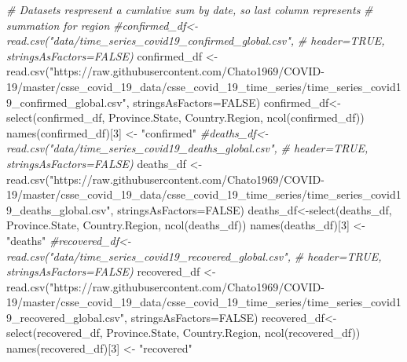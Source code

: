 \documentclass[
]{article}
\newenvironment{Shaded}{\begin{snugshade}}{\end{snugshade}}
\newcommand{\AttributeTok}[1]{\textcolor[rgb]{0.77,0.63,0.00}{#1}}
\newcommand{\CommentTok}[1]{\textcolor[rgb]{0.56,0.35,0.01}{\textit{#1}}}
\newcommand{\ConstantTok}[1]{\textcolor[rgb]{0.00,0.00,0.00}{#1}}
\newcommand{\DecValTok}[1]{\textcolor[rgb]{0.00,0.00,0.81}{#1}}
\newcommand{\FunctionTok}[1]{\textcolor[rgb]{0.00,0.00,0.00}{#1}}
\newcommand{\NormalTok}[1]{#1}
\newcommand{\OtherTok}[1]{\textcolor[rgb]{0.56,0.35,0.01}{#1}}
\newcommand{\StringTok}[1]{\textcolor[rgb]{0.31,0.60,0.02}{#1}}
\begin{document}
\begin{Shaded}
\begin{Highlighting}[]
\CommentTok{\# Datasets respresent a cumlative sum by date, so last column represents }
\CommentTok{\# summation for region}
\CommentTok{\#confirmed\_df\textless{}{-}read.csv("data/time\_series\_covid19\_confirmed\_global.csv", }
\CommentTok{\#                       header=TRUE, stringsAsFactors=FALSE)}
\NormalTok{confirmed\_df }\OtherTok{\textless{}{-}} \FunctionTok{read.csv}\NormalTok{(}\StringTok{"https://raw.githubusercontent.com/Chato1969/COVID{-}19/master/csse\_covid\_19\_data/csse\_covid\_19\_time\_series/time\_series\_covid19\_confirmed\_global.csv"}\NormalTok{, }\AttributeTok{stringsAsFactors=}\ConstantTok{FALSE}\NormalTok{)}
\NormalTok{confirmed\_df}\OtherTok{\textless{}{-}}\FunctionTok{select}\NormalTok{(confirmed\_df, Province.State, }
\NormalTok{                     Country.Region, }\FunctionTok{ncol}\NormalTok{(confirmed\_df))}
\FunctionTok{names}\NormalTok{(confirmed\_df)[}\DecValTok{3}\NormalTok{] }\OtherTok{\textless{}{-}} \StringTok{"confirmed"}
\CommentTok{\#deaths\_df\textless{}{-}read.csv("data/time\_series\_covid19\_deaths\_global.csv", }
\CommentTok{\#                    header=TRUE, stringsAsFactors=FALSE)}
\NormalTok{deaths\_df }\OtherTok{\textless{}{-}} \FunctionTok{read.csv}\NormalTok{(}\StringTok{"https://raw.githubusercontent.com/Chato1969/COVID{-}19/master/csse\_covid\_19\_data/csse\_covid\_19\_time\_series/time\_series\_covid19\_deaths\_global.csv"}\NormalTok{, }\AttributeTok{stringsAsFactors=}\ConstantTok{FALSE}\NormalTok{)}
\NormalTok{deaths\_df}\OtherTok{\textless{}{-}}\FunctionTok{select}\NormalTok{(deaths\_df, Province.State, }
\NormalTok{                  Country.Region, }\FunctionTok{ncol}\NormalTok{(deaths\_df))}
\FunctionTok{names}\NormalTok{(deaths\_df)[}\DecValTok{3}\NormalTok{] }\OtherTok{\textless{}{-}} \StringTok{"deaths"}
\CommentTok{\#recovered\_df\textless{}{-}read.csv("data/time\_series\_covid19\_recovered\_global.csv", }
\CommentTok{\#                       header=TRUE, stringsAsFactors=FALSE)}
\NormalTok{recovered\_df }\OtherTok{\textless{}{-}} \FunctionTok{read.csv}\NormalTok{(}\StringTok{"https://raw.githubusercontent.com/Chato1969/COVID{-}19/master/csse\_covid\_19\_data/csse\_covid\_19\_time\_series/time\_series\_covid19\_recovered\_global.csv"}\NormalTok{, }\AttributeTok{stringsAsFactors=}\ConstantTok{FALSE}\NormalTok{)}
\NormalTok{recovered\_df}\OtherTok{\textless{}{-}}\FunctionTok{select}\NormalTok{(recovered\_df, Province.State, }
\NormalTok{                     Country.Region, }\FunctionTok{ncol}\NormalTok{(recovered\_df))}
\FunctionTok{names}\NormalTok{(recovered\_df)[}\DecValTok{3}\NormalTok{] }\OtherTok{\textless{}{-}} \StringTok{"recovered"}


\end{Highlighting}
\end{Shaded}
\end{document}

